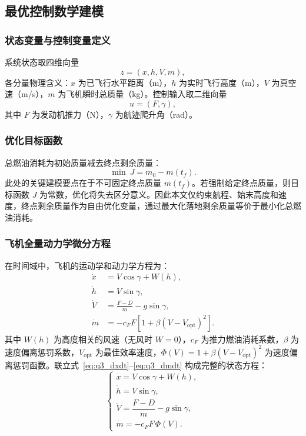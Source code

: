 \documentclass[withoutpreface,bwprint]{cumcmthesis}
\begin{document}
\subsection{最优控制数学建模}

\subsubsection{状态变量与控制变量定义}

系统状态取四维向量
\[
z=(x,h,V,m),
\]
各分量物理含义：$x$ 为已飞行水平距离（m），$h$ 为实时飞行高度（m），$V$ 为真空速（m/s），$m$ 为飞机瞬时总质量（kg）。控制输入取二维向量
\[
u=(F,\gamma),
\]
其中 $F$ 为发动机推力（N），$\gamma$ 为航迹爬升角（rad）。

\subsubsection{优化目标函数}

总燃油消耗为初始质量减去终点剩余质量：
\begin{equation}
\min\ J = m_0 - m(t_f).
\label{eq:q3_objective}
\end{equation}
此处的关键建模要点在于不可固定终点质量 $m(t_f)$。若强制给定终点质量，则目标函数 $J$ 为常数，优化将失去区分意义。因此本文仅约束航程、始末高度和速度，终点剩余质量作为自由优化变量，通过最大化落地剩余质量等价于最小化总燃油消耗。

\subsubsection{飞机全量动力学微分方程}

在时间域中，飞机的运动学和动力学方程为：
\begin{align}
\dot{x} &= V\cos\gamma + W(h), \label{eq:q3_dxdt}\\
\dot{h} &= V\sin\gamma, \label{eq:q3_dhdt}\\
\dot{V} &= \frac{F-D}{m} - g\sin\gamma, \label{eq:q3_dVdt}\\
\dot{m} &= -c_F F \left[1+\beta(V-V_{\mathrm{opt}})^2\right]. \label{eq:q3_dmdt}
\end{align}
其中 $W(h)$ 为高度相关的风速（无风时 $W=0$），$c_F$ 为推力燃油消耗系数，$\beta$ 为速度偏离惩罚系数，$V_{\mathrm{opt}}$ 为最佳效率速度，$\Phi(V)=1+\beta(V-V_{\mathrm{opt}})^2$ 为速度偏离惩罚函数。联立式~\eqref{eq:q3_dxdt}--\eqref{eq:q3_dmdt} 构成完整的状态方程：
\begin{equation}
\begin{cases}
\dot x = V\cos\gamma + W(h),\\[3pt]
\dot h = V\sin\gamma,\\[3pt]
\dot V = \dfrac{F-D}{m} - g\sin\gamma,\\[8pt]
\dot m = -c_F F\,\Phi(V).
\end{cases}
\label{eq:q3_dynamics}
\end{equation}
\end{document}
